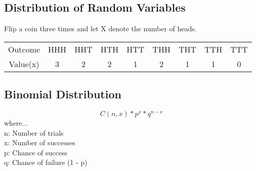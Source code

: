 \documentclass[]{article}
\begin{document}
	\subsection*{Distribution of Random Variables}
	Flip a coin three times and let X denote the number of heads.
	\begin{center}
		\begin{tabular}{ |c|c|c|c|c|c|c|c|c| }
			\hline 
				Outcome & HHH & HHT & HTH & HTT & THH & THT & TTH &  TTT \\
				Value(x) & 3 & 2 & 2 & 1 & 2 & 1 & 1 & 0 \\
			\hline
		\end{tabular}
	\end{center}

	\subsection*{Binomial Distribution}
		\begin{equation*}
			C(n, x) * p^x * q^{n - x}
		\end{equation*}
	where... \\
	\indent n: Number of trials \\
	\indent x: Number of successes \\
	\indent p: Chance of success \\
	\indent q: Chance of failure (1 - p) 
\end{document}
